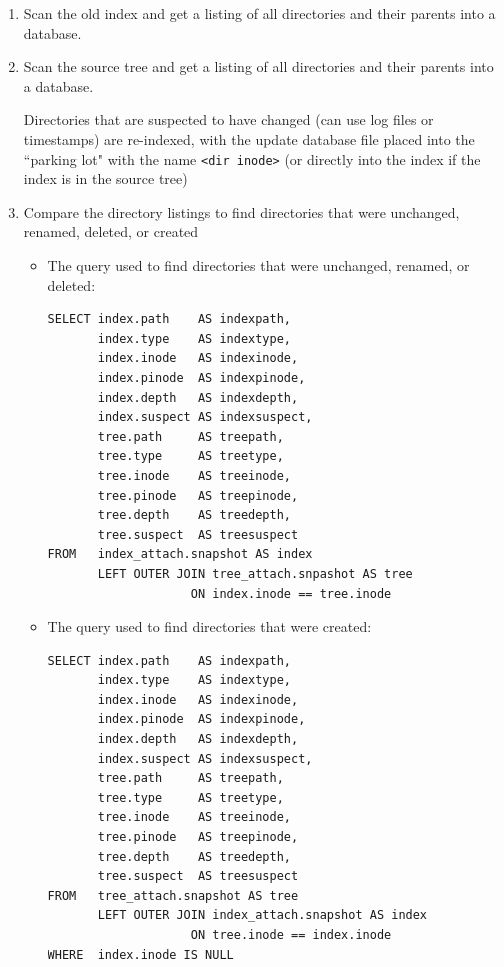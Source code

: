 \begin{enumerate}
\item Scan the old index and get a listing of all directories and
  their parents into a \sqlite database.

\item Scan the source tree and get a listing of all directories and
  their parents into a \sqlite database.

    Directories that are suspected to have changed (can use log files
    or timestamps) are re-indexed, with the update database file
    placed into the ``parking lot" with the name \texttt{<dir inode>}
    (or directly into the index if the index is in the source tree)

\item Compare the directory listings to find directories that were
  unchanged, renamed, deleted, or created
  \begin{itemize}
    \item The query used to find directories that were unchanged,
      renamed, or deleted:
      \begin{verbatim}
SELECT index.path    AS indexpath,
       index.type    AS indextype,
       index.inode   AS indexinode,
       index.pinode  AS indexpinode,
       index.depth   AS indexdepth,
       index.suspect AS indexsuspect,
       tree.path     AS treepath,
       tree.type     AS treetype,
       tree.inode    AS treeinode,
       tree.pinode   AS treepinode,
       tree.depth    AS treedepth,
       tree.suspect  AS treesuspect
FROM   index_attach.snapshot AS index
       LEFT OUTER JOIN tree_attach.snpashot AS tree
                    ON index.inode == tree.inode
      \end{verbatim}
    \item The query used to find directories that were created:
      \begin{verbatim}
SELECT index.path    AS indexpath,
       index.type    AS indextype,
       index.inode   AS indexinode,
       index.pinode  AS indexpinode,
       index.depth   AS indexdepth,
       index.suspect AS indexsuspect,
       tree.path     AS treepath,
       tree.type     AS treetype,
       tree.inode    AS treeinode,
       tree.pinode   AS treepinode,
       tree.depth    AS treedepth,
       tree.suspect  AS treesuspect
FROM   tree_attach.snapshot AS tree
       LEFT OUTER JOIN index_attach.snapshot AS index
                    ON tree.inode == index.inode
WHERE  index.inode IS NULL
    \end{verbatim}
  \end{itemize}


\end{enumerate}
